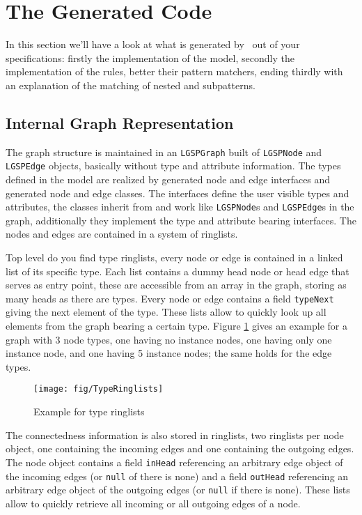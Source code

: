 \section{The Generated Code}\label{sec:generatedcode}
In this section we'll have a look at what is generated by \GrG~out of your specifications: firstly the implementation of the model, secondly the implementation of the rules, better their pattern matchers, ending thirdly with an explanation of the matching of nested and subpatterns.

\subsection*{Internal Graph Representation}
The graph structure is maintained in an \texttt{LGSPGraph} built of \texttt{LGSPNode} and \texttt{LGSPEdge} objects, basically without type and attribute information.
The types defined in the model are realized by generated node and edge interfaces and generated node and edge classes.
The interfaces define the user visible types and attributes, the classes inherit from and work like \texttt{LGSPNode}s and \texttt{LGSPEdge}s in the graph, additionally they implement the type and attribute bearing interfaces.
The nodes and edges are contained in a system of ringlists.

Top level do you find type ringlists, every node or edge is contained in a linked list of its specific type.
Each list contains a dummy head node or head edge that serves as entry point, 
these are accessible from an array in the graph, storing as many heads as there are types.
Every node or edge contains a field \texttt{typeNext} giving the next element of the type.
These lists allow to quickly look up all elements from the graph bearing a certain type.
Figure \ref{figtyperinglists} gives an example for a graph with 3 node types, one having no instance nodes, one having only one instance node, and one having 5 instance nodes; the same holds for the edge types.

\begin{figure}[htbp]
  \centering
  \texttt{[image: fig/TypeRinglists]}
  \caption{Example for type ringlists}
  \label{figtyperinglists}
\end{figure}

The connectedness information is also stored in ringlists, two ringlists per node object,
one containing the incoming edges and one containing the outgoing edges.
The node object contains a field \texttt{inHead} referencing an arbitrary edge object of the incoming edges (or \texttt{null} of there is none) and a field \texttt{outHead} referencing an arbitrary edge object of the outgoing edges (or \texttt{null} if there is none).
These lists allow to quickly retrieve all incoming or all outgoing edges of a node.

